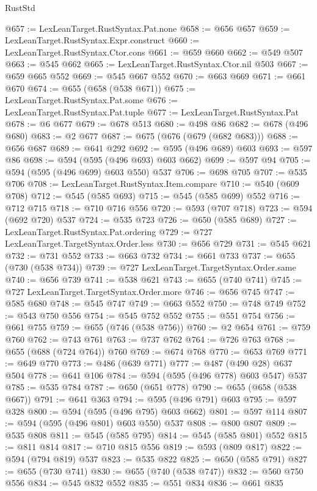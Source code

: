 \begin{lexlean}{RustStd}
\begin{coremodule}
@657 := LexLeanTarget.RustSyntax.Pat.none
@658 := @656 @657
@659 := LexLeanTarget.RustSyntax.Expr.construct
@660 := LexLeanTarget.RustSyntax.Ctor.cons
@661 := @659 @660
@662 := @549 @507
@663 := @545 @662
@665 := LexLeanTarget.RustSyntax.Ctor.nil @503
@667 := @659 @665 @552
@669 := @545 @667 @552
@670 := @663 @669
@671 := @661 @670
@674 := @655 (@658 (@538 @671))
@675 := LexLeanTarget.RustSyntax.Pat.some
@676 := LexLeanTarget.RustSyntax.Pat.tuple
@677 := LexLeanTarget.RustSyntax.Pat
@678 := @6 @677
@679 := @678 @513
@680 := @498 @86
@682 := @678 (@496 @680)
@683 := @2 @677
@687 := @675 (@676 (@679 (@682 @683)))
@688 := @656 @687
@689 := @641 @292
@692 := @595 (@496 @689) @603
@693 := @597 @86
@698 := @594 (@595 (@496 @693) @603 @662)
@699 := @597 @94
@705 := @594 (@595 (@496 @699) @603 @550) @537
@706 := @698 @705
@707 := @535 @706
@708 := LexLeanTarget.RustSyntax.Item.compare
@710 := @540 (@609 @708)
@712 := @545 (@585 @693)
@715 := @545 (@585 @699) @552
@716 := @712 @715
@718 := @710 @716 @556
@720 := @593 (@707 @718)
@723 := @594 (@692 @720) @537
@724 := @535 @723
@726 := @650 (@585 @689)
@727 := LexLeanTarget.RustSyntax.Pat.ordering
@729 := @727 LexLeanTarget.TargetSyntax.Order.less
@730 := @656 @729
@731 := @545 @621
@732 := @731 @552
@733 := @663 @732
@734 := @661 @733
@737 := @655 (@730 (@538 @734))
@739 := @727 LexLeanTarget.TargetSyntax.Order.same
@740 := @656 @739
@741 := @538 @621
@743 := @655 (@740 @741)
@745 := @727 LexLeanTarget.TargetSyntax.Order.more
@746 := @656 @745
@747 := @585 @680
@748 := @545 @747
@749 := @663 @552
@750 := @748 @749
@752 := @543 @750 @556
@754 := @545 @752 @552
@755 := @551 @754
@756 := @661 @755
@759 := @655 (@746 (@538 @756))
@760 := @2 @654
@761 := @759 @760
@762 := @743 @761
@763 := @737 @762
@764 := @726 @763
@768 := @655 (@688 (@724 @764)) @760
@769 := @674 @768
@770 := @653 @769
@771 := @649 @770
@773 := @486 (@639 @771)
@777 := @487 (@490 @28) @637 @504
@778 := @641 @106
@784 := @594 (@595 (@496 @778) @603 @547) @537
@785 := @535 @784
@787 := @650 (@651 @778)
@790 := @655 (@658 (@538 @667))
@791 := @641 @363
@794 := @595 (@496 @791) @603
@795 := @597 @328
@800 := @594 (@595 (@496 @795) @603 @662)
@801 := @597 @114
@807 := @594 (@595 (@496 @801) @603 @550) @537
@808 := @800 @807
@809 := @535 @808
@811 := @545 (@585 @795)
@814 := @545 (@585 @801) @552
@815 := @811 @814
@817 := @710 @815 @556
@819 := @593 (@809 @817)
@822 := @594 (@794 @819) @537
@823 := @535 @822
@825 := @650 (@585 @791)
@827 := @655 (@730 @741)
@830 := @655 (@740 (@538 @747))
@832 := @560 @750 @556
@834 := @545 @832 @552
@835 := @551 @834
@836 := @661 @835

\end{coremodule}
\end{lexlean}

